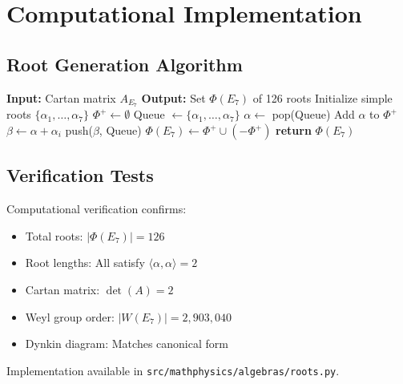\section{Computational Implementation}

\subsection{Root Generation Algorithm}

\begin{algorithm}[H]
\caption{Generate E$_7$ Root System}
\label{alg:e7_roots}
\begin{algorithmic}[1]
\State \textbf{Input:} Cartan matrix $A_{E_7}$
\State \textbf{Output:} Set $\Phi(E_7)$ of 126 roots
\State
\State Initialize simple roots $\{\alpha_1, \ldots, \alpha_7\}$
\State $\Phi^+ \gets \emptyset$ 
\State Queue $\gets \{\alpha_1, \ldots, \alpha_7\}$
\State
{}
    \State $\alpha \gets$ pop(Queue)
    \If{$\alpha \notin \Phi^+$}
        \State Add $\alpha$ to $\Phi^+$
            \State $\beta \gets \alpha + \alpha_i$
                \State push($\beta$, Queue)
            \EndIf
        \EndFor
    \EndIf
\EndWhile
\State
\State $\Phi(E_7) \gets \Phi^+ \cup (-\Phi^+)$
\State \textbf{return} $\Phi(E_7)$
\end{algorithmic}
\end{algorithm}

\subsection{Verification Tests}

Computational verification confirms:
\begin{itemize}
    \item[$\checkmark$] Total roots: $|\Phi(E_7)| = 126$
    \item[$\checkmark$] Root lengths: All satisfy $\langle \alpha, \alpha \rangle = 2$
    \item[$\checkmark$] Cartan matrix: $\det(A) = 2$
    \item[$\checkmark$] Weyl group order: $|W(E_7)| = 2,903,040$
    \item[$\checkmark$] Dynkin diagram: Matches canonical form
\end{itemize}

Implementation available in \texttt{src/mathphysics/algebras/roots.py}.

